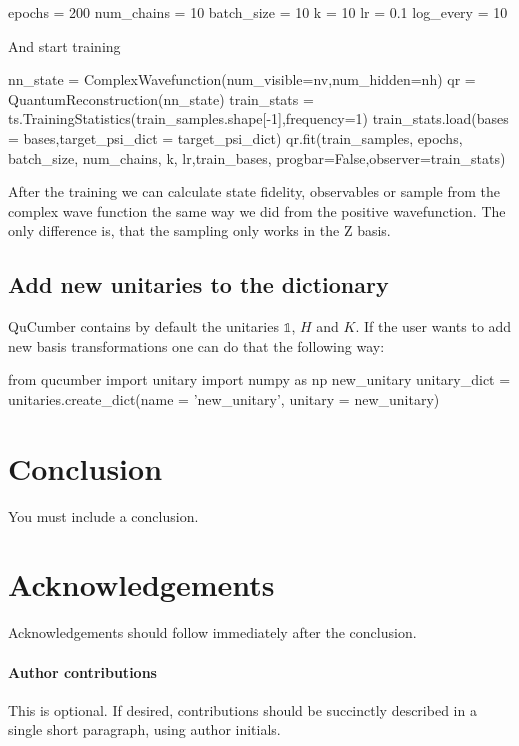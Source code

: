 \documentclass[submission, Phys]{SciPost}
\begin{document}
\begin{python}
epochs     = 200
num_chains = 10
batch_size = 10
k          = 10
lr         = 0.1
log_every  = 10
\end{python}

And start training

\begin{python}
nn_state = ComplexWavefunction(num_visible=nv,num_hidden=nh)
qr = QuantumReconstruction(nn_state)
train_stats = ts.TrainingStatistics(train_samples.shape[-1],frequency=1)
train_stats.load(bases = bases,target_psi_dict = target_psi_dict)
qr.fit(train_samples, epochs, batch_size, num_chains, k,
       lr,train_bases, progbar=False,observer=train_stats)
\end{python}

After the training we can calculate state fidelity, observables or sample from the complex wave function the same way we did from the positive wavefunction. The only difference is, that the sampling only works in the Z basis.

\subsection{Add new unitaries to the dictionary}

QuCumber contains by default the unitaries $\mathds{1}$, $H$ and $K$. If the user wants to add new basis transformations one can do that the following way:

\begin{python}
from qucumber import unitary
import numpy as np
new_unitary
unitary_dict = unitaries.create_dict(name = 'new_unitary', unitary = new_unitary)
\end{python}

\section{Conclusion}
You must include a conclusion.

\section*{Acknowledgements}
Acknowledgements should follow immediately after the conclusion.

\paragraph{Author contributions}
This is optional. If desired, contributions should be succinctly described in a single short paragraph, using author initials.
\end{document}
